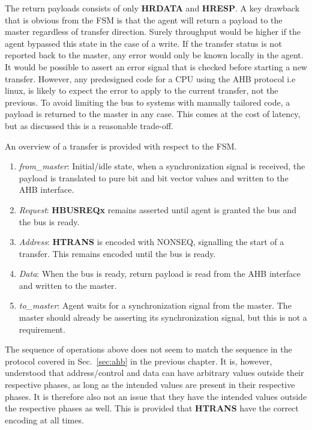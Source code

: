 The return payloads consists of only \textbf{HRDATA} and \textbf{HRESP}. A key drawback that is obvious from the FSM is that the agent will return a payload 
to the master regardless of transfer direction. Surely throughput would be higher if the agent bypassed this state in the case of a write. If the transfer
status is not reported back to the master, any error would only be known locally in the agent. It would be possible to assert an error signal that is checked 
before starting a new transfer. However, any predesigned code for a CPU using the AHB protocol i.e linux, is likely to expect the error to apply to the current transfer, not the previous. To avoid limiting the bus to systems with manually tailored code, a payload is returned to the master in any case. This comes
at the cost of latency, but as discussed this is a reasonable trade-off. \par
An overview of a transfer is provided with respect to the FSM.
\begin{enumerate}
 \item \textit{from\_master}: Initial/idle state, when a synchronization signal is received, the payload is translated to pure bit and bit vector values and written to the AHB interface.
 \item \textit{Request}: \textbf{HBUSREQx} remains asserted until agent is granted the bus and the bus is ready.
 \item \textit{Address}: \textbf{HTRANS} is encoded with NONSEQ, signalling the start of a transfer. This remains encoded until the bus is ready.
 \item \textit{Data}: When the bus is ready, return payload is read from the AHB interface and written to the master.
 \item \textit{to\_master}: Agent waits for a synchronization signal from the master. The master should already be asserting its synchronization signal, but this is not a requirement.   
\end{enumerate}

The sequence of operations above does not seem to match the sequence in the protocol covered in Sec.~\ref{sec:ahb} in the previous chapter. It is, however, 
understood that address/control and data can have arbitrary values outside their respective phases, as long as the intended values are present in their 
respective phases. It is therefore also not an issue that they have the intended values outside the respective phases as well. This is provided that \textbf{HTRANS} have the correct encoding at all times. 
\newpage 

